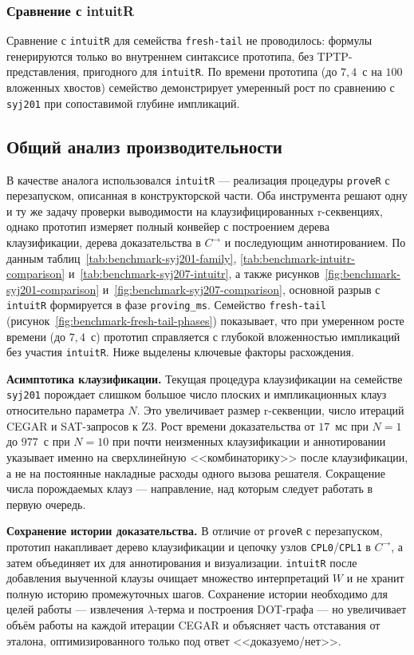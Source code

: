 \documentclass[14pt, russian]{scrartcl}
\begin{document}
\subsubsection{Сравнение с intuitR}

Сравнение с \texttt{intuitR} для семейства \texttt{fresh-tail} не проводилось:
формулы генерируются только во внутреннем синтаксисе прототипа, без
TPTP-представления, пригодного для \texttt{intuitR}. По времени прототипа
(до $7{,}4$~с на $100$ вложенных хвостов) семейство демонстрирует умеренный
рост по сравнению с \texttt{syj201} при сопоставимой глубине импликаций.

\subsection{Общий анализ производительности}

В качестве аналога использовался \texttt{intuitR} --- реализация процедуры
\texttt{proveR} с перезапуском, описанная в конструкторской части. Оба
инструмента решают одну и ту же задачу проверки выводимости на
клаузифицированных r-секвенциях, однако прототип измеряет полный конвейер с
построением дерева клаузификации, дерева доказательства в $C^{\rightarrow}$ и
последующим аннотированием. По данным таблиц~\ref{tab:benchmark-syj201-family},
\ref{tab:benchmark-intuitr-comparison} и~\ref{tab:benchmark-syj207-intuitr}, а
также рисунков~\ref{fig:benchmark-syj201-comparison}
и~\ref{fig:benchmark-syj207-comparison}, основной разрыв с \texttt{intuitR}
формируется в фазе \texttt{proving\_ms}. Семейство \texttt{fresh-tail}
(рисунок~\ref{fig:benchmark-fresh-tail-phases}) показывает, что при умеренном
росте времени (до $7{,}4$~с) прототип справляется с глубокой вложенностью
импликаций без участия \texttt{intuitR}. Ниже выделены ключевые факторы расхождения.

\textbf{Асимптотика клаузификации.} Текущая процедура клаузификации на
  семействе \texttt{syj201} порождает слишком большое число плоских и
  импликационных клауз относительно параметра $N$. Это увеличивает размер
  r-секвенции, число итераций CEGAR и SAT-запросов к Z3. Рост времени
  доказательства от $17$~мс при $N = 1$ до $977$~с при $N = 10$ при почти
  неизменных клаузификации и аннотировании указывает именно на
  сверхлинейную <<комбинаторику>> после клаузификации, а не на постоянные
  накладные расходы одного вызова решателя. Сокращение числа порождаемых клауз
  --- направление, над которым следует работать в первую очередь.

\textbf{Сохранение истории доказательства.} В отличие от \texttt{proveR}
  с перезапуском, прототип накапливает дерево клаузификации и цепочку узлов
  \texttt{CPL0}/\texttt{CPL1} в $C^{\rightarrow}$, а затем объединяет их для
  аннотирования и визуализации. \texttt{intuitR} после добавления выученной
  клаузы очищает множество интерпретаций $W$ и не хранит полную историю
  промежуточных шагов. Сохранение истории необходимо для целей работы ---
  извлечения $\lambda$-терма и построения DOT-графа --- но увеличивает объём
  работы на каждой итерации CEGAR и объясняет часть отставания от эталона,
  оптимизированного только под ответ <<доказуемо/нет>>.
\end{document}
